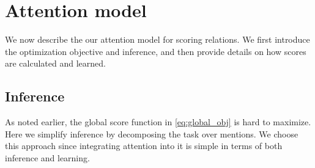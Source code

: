 \section{Attention model}
\label{sec:attention}

We now describe the our attention model for scoring relations. We first introduce the optimization objective and inference, and then provide details on how scores are calculated and learned.

\subsection{Inference}
As noted earlier, the global score function in \eqref{eq:global_obj} is hard to maximize.
Here we simplify inference by decomposing the task over mentions. 
We choose this approach since integrating attention into it is simple in terms of both inference and learning.


